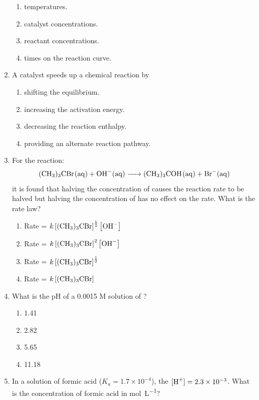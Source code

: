 \documentclass[11pt, leqno]{article}
\begin{document}
\begin{enumerate}[leftmargin = *]
\begin{enumerate}
    \item temperatures.
    \item catalyst concentrations.
    \item reactant concentrations.
    \item times on the reaction curve.
\end{enumerate}
\item A catalyst speeds up a chemical reaction by
\begin{enumerate}
    \item shifting the equilibrium.
    \item increasing the activation energy.
    \item decreasing the reaction enthalpy.
    \item providing an alternate reaction pathway.
\end{enumerate}
\item For the reaction:
\begin{align*}
    \ce{(CH3)3CBr(aq) + OH-(aq) -> (CH3)3COH(aq) + Br-(aq)}
\end{align*}
it is found that halving the concentration of  causes the reaction rate to be halved but halving the concentration of  has no effect on the rate. What is the rate law?
\begin{enumerate}
    \item Rate  = $k\left[\ce{(CH3)3CBr}\right]^{\frac{1}{2}}\left[\ce{OH-}\right]$
   \item Rate  = $k\left[\ce{(CH3)3CBr}\right]^{2}\left[\ce{OH-}\right]$
   \item Rate  = $k\left[\ce{(CH3)3CBr}\right]^{\frac{1}{2}}$
   \item Rate  = $k\left[\ce{(CH3)3CBr}\right]$
\end{enumerate}
\item What is the pH of a 0.0015 M solution of ?
\begin{enumerate}
    \item 1.41
    \item 2.82
    \item 5.65
    \item 11.18
\end{enumerate}
\newpage
\item In a solution of formic acid ($K_a = 1.7 \times 10^{-4}$), the $[\ce{H+}] = 2.3 \times 10^{-3}$. What is the concentration of formic acid in \si{\mole\per\liter}?
\begin{enumerate}

\end{enumerate}
\end{enumerate}
\end{document}
